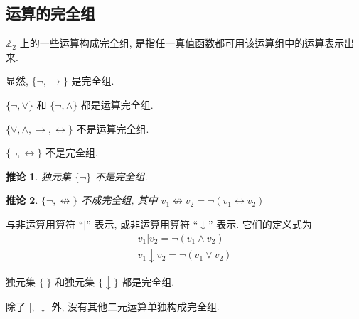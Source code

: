 \documentclass[
    color=black,
    device=normal,
    lang=cn
]{elegantnote}
\newtheorem{deduction}{推论}[section]
\begin{document}
\subsection{运算的完全组}
\begin{definition}[运算的完全组]
    $\mathbb{Z}_2$ 上的一些运算构成完全组, 是指任一真值函数都可用该运算组中的运算表示出来.
\end{definition}
显然, $\{\lnot,\to\}$ 是完全组.
\begin{proposition}
    $\{\lnot, \lor\}$ 和 $\{\lnot,\land\}$ 都是运算完全组.
\end{proposition}
\begin{proposition}
    $\{\lor,\land,\to,\leftrightarrow\}$ 不是运算完全组.
\end{proposition}
\begin{proposition}
    $\{\lnot,\leftrightarrow\}$ 不是完全组.
\end{proposition}
\begin{deduction}
    独元集 $\{\lnot\}$ 不是完全组.
\end{deduction}
\begin{deduction}
    $\{\lnot,\not\leftrightarrow\}$ 不成完全组, 其中 $v_1\not\leftrightarrow v_2 = \lnot (v_1\leftrightarrow v_2)$
\end{deduction}
\begin{definition}[``与非'' 运算和 ``或非'' 运算]
    与非运算用算符 ``$\vert$'' 表示, 或非运算用算符 ``$\downarrow$'' 表示. 它们的定义式为
    \begin{gather*}
        v_1\vert v_2 = \lnot (v_1\land v_2)\\
        v_1\downarrow v_2 = \lnot (v_1\lor v_2)
    \end{gather*}
\end{definition}
\begin{proposition}
    独元集 $\{\vert\}$ 和独元集 $\{\downarrow\}$ 都是完全组.
\end{proposition}
\begin{proposition}
    除了 $\vert$, $\downarrow$ 外, 没有其他二元运算单独构成完全组.
\end{proposition}
\end{document}

